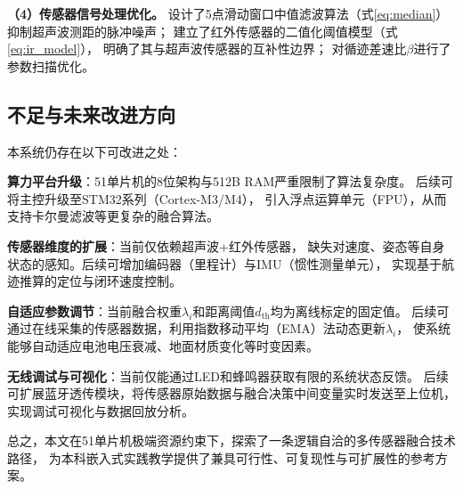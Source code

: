 \documentclass[12pt,a4paper]{ctexart}
\begin{document}
\textbf{（4）传感器信号处理优化。}
设计了5点滑动窗口中值滤波算法（式\ref{eq:median}）抑制超声波测距的脉冲噪声；
建立了红外传感器的二值化阈值模型（式\ref{eq:ir_model}），
明确了其与超声波传感器的互补性边界；
对循迹差速比$\beta$进行了参数扫描优化。

\subsection{不足与未来改进方向}

本系统仍存在以下可改进之处：

\textbf{算力平台升级}：51单片机的8位架构与512B RAM严重限制了算法复杂度。
后续可将主控升级至STM32系列（Cortex-M3/M4），
引入浮点运算单元（FPU），从而支持卡尔曼滤波等更复杂的融合算法。

\textbf{传感器维度的扩展}：当前仅依赖超声波+红外传感器，
缺失对速度、姿态等自身状态的感知。后续可增加编码器（里程计）与IMU（惯性测量单元），
实现基于航迹推算的定位与闭环速度控制。

\textbf{自适应参数调节}：当前融合权重$\lambda_i$和距离阈值$d_{\text{th}}$均为离线标定的固定值。
后续可通过在线采集的传感器数据，利用指数移动平均（EMA）法动态更新$\lambda_i$，
使系统能够自动适应电池电压衰减、地面材质变化等时变因素。

\textbf{无线调试与可视化}：当前仅能通过LED和蜂鸣器获取有限的系统状态反馈。
后续可扩展蓝牙透传模块，将传感器原始数据与融合决策中间变量实时发送至上位机，
实现调试可视化与数据回放分析。

总之，本文在51单片机极端资源约束下，探索了一条逻辑自洽的多传感器融合技术路径，
为本科嵌入式实践教学提供了兼具可行性、可复现性与可扩展性的参考方案。

\printbibliography[title=参考文献]
\end{document}
